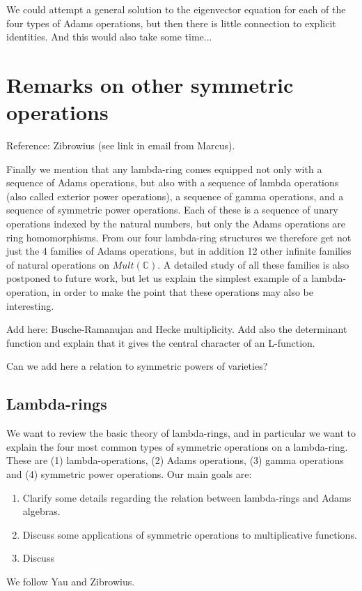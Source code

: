 \documentclass[a4paper]{article}
\begin{document}
We could attempt a general solution to the eigenvector equation for each of the four types of Adams operations, but then there is little connection to explicit identities. And this would also take some time...




\section{Remarks on other symmetric operations}

Reference: Zibrowius (see link in email from Marcus). 

Finally we mention that any lambda-ring comes equipped not only with a sequence of Adams operations, but also with a sequence of lambda operations (also called exterior power operations), a sequence of gamma operations, and a sequence of symmetric power operations. Each of these is a sequence of unary operations indexed by the natural numbers, but only the Adams operations are ring homomorphisms. From our four lambda-ring structures we therefore get not just the 4 families of Adams operations, but in addition 12 other infinite families of natural operations on $Mult(\mathbb{C})$. A detailed study of all these families is also postponed to future work, but let us explain the simplest example of a lambda-operation, in order to make the point that these operations may also be interesting.

Add here: Busche-Ramanujan and Hecke multiplicity. Add also the determinant function and explain that it gives the central character of an L-function.

Can we add here a relation to symmetric powers of varieties?


\subsection{Lambda-rings}

We want to review the basic theory of lambda-rings, and in particular we want to explain the four most common types of symmetric operations on a lambda-ring. These are (1) lambda-operations, (2) Adams operations, (3) gamma operations and (4) symmetric power operations. Our main goals are:
\begin{enumerate}
\item Clarify some details regarding the relation between lambda-rings and Adams algebras.
\item Discuss some applications of symmetric operations to multiplicative functions.
\item Discuss
\end{enumerate}
We follow Yau and Zibrowius.
\end{document}
